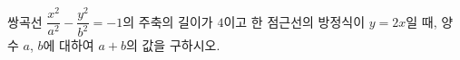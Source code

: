쌍곡선 $\dfrac{x^2}{a^2}-\dfrac{y^2}{b^2}=-1$의 주축의 길이가 $4$이고 한 점근선의 방정식이 $y=2x$일 때, 양수 $a$, $b$에 대하여 $a+b$의 값을 \mbox{구하시오.}
